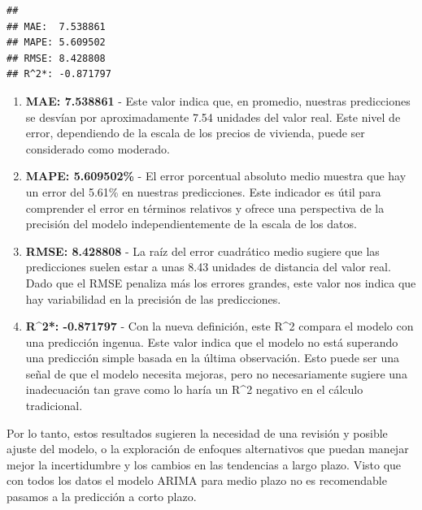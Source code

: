 \documentclass[
]{article}
\newenvironment{Shaded}{\begin{snugshade}}{\end{snugshade}}
\newcommand{\DecValTok}[1]{\textcolor[rgb]{0.00,0.00,0.81}{#1}}
\newcommand{\FunctionTok}[1]{\textcolor[rgb]{0.00,0.00,0.00}{#1}}
\newcommand{\NormalTok}[1]{#1}
\newcommand{\OtherTok}[1]{\textcolor[rgb]{0.56,0.35,0.01}{#1}}
\newcommand{\SpecialCharTok}[1]{\textcolor[rgb]{0.00,0.00,0.00}{#1}}
\begin{document}
\begin{Shaded}
\end{Shaded}

\begin{verbatim}
## 
## MAE:  7.538861 
## MAPE: 5.609502 
## RMSE: 8.428808 
## R^2*: -0.871797
\end{verbatim}

\begin{enumerate}
\def\labelenumi{\arabic{enumi}.}
\item
  \textbf{MAE: 7.538861} - Este valor indica que, en promedio, nuestras
  predicciones se desvían por aproximadamente 7.54 unidades del valor
  real. Este nivel de error, dependiendo de la escala de los precios de
  vivienda, puede ser considerado como moderado.
\item
  \textbf{MAPE: 5.609502\%} - El error porcentual absoluto medio muestra
  que hay un error del 5.61\% en nuestras predicciones. Este indicador
  es útil para comprender el error en términos relativos y ofrece una
  perspectiva de la precisión del modelo independientemente de la escala
  de los datos.
\item
  \textbf{RMSE: 8.428808} - La raíz del error cuadrático medio sugiere
  que las predicciones suelen estar a unas 8.43 unidades de distancia
  del valor real. Dado que el RMSE penaliza más los errores grandes,
  este valor nos indica que hay variabilidad en la precisión de las
  predicciones.
\item
  \textbf{R\^{}2*: -0.871797} - Con la nueva definición, este R\^{}2
  compara el modelo con una predicción ingenua. Este valor indica que el
  modelo no está superando una predicción simple basada en la última
  observación. Esto puede ser una señal de que el modelo necesita
  mejoras, pero no necesariamente sugiere una inadecuación tan grave
  como lo haría un R\^{}2 negativo en el cálculo tradicional.
\end{enumerate}

Por lo tanto, estos resultados sugieren la necesidad de una revisión y
posible ajuste del modelo, o la exploración de enfoques alternativos que
puedan manejar mejor la incertidumbre y los cambios en las tendencias a
largo plazo. Visto que con todos los datos el modelo ARIMA para medio
plazo no es recomendable pasamos a la predicción a corto plazo.
\end{document}
